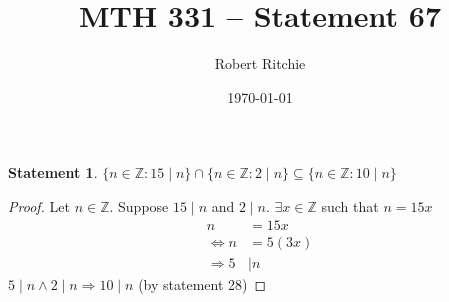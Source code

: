 \documentclass[11pt]{article}
\newtheorem{statement}{Statement}%
\begin{document}
\author{Robert Ritchie}
\title{MTH 331 -- Statement 67}
\date{\today}

\maketitle

\begin{statement}
$\{n\in\mathbb{Z}:15\mid n\} \cap \{ n\in\mathbb{Z}:2\mid n \}  \subseteq \{ n\in\mathbb{Z}:10\mid n \}$
\end{statement}

\begin{proof}
Let $n\in\mathbb{Z}$.
Suppose $15\mid n$ and $2\mid n$.
$\exists x \in \mathbb{Z}$ such that $n=15x$
\begin{align*}
n&=15x\\
\Leftrightarrow n&=5(3x)\\
\Rightarrow 5 &
\mid n
\end{align*}
$5 \mid n \wedge 2 \mid n \Rightarrow 10 \mid n$ (by statement 28)
\end{proof}
\end{document}
